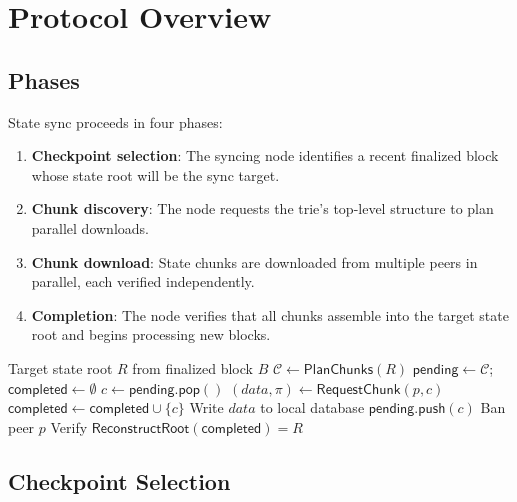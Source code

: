 \section{Protocol Overview}
\label{sec:overview}

\subsection{Phases}

State sync proceeds in four phases:

\begin{enumerate}
    \item \textbf{Checkpoint selection}: The syncing node identifies a recent finalized block whose state root will be the sync target.
    \item \textbf{Chunk discovery}: The node requests the trie's top-level structure to plan parallel downloads.
    \item \textbf{Chunk download}: State chunks are downloaded from multiple peers in parallel, each verified independently.
    \item \textbf{Completion}: The node verifies that all chunks assemble into the target state root and begins processing new blocks.
\end{enumerate}

\begin{algorithm}[H]
\caption{State Sync Main Loop}
\label{alg:main}
\begin{algorithmic}[1]
\Require Target state root $R$ from finalized block $B$
\State $\mathcal{C} \gets \mathsf{PlanChunks}(R)$ 
\State $\mathsf{pending} \gets \mathcal{C}$; $\mathsf{completed} \gets \emptyset$
        \State $c \gets \mathsf{pending}.\mathsf{pop}()$
        \State $(data, \pi) \gets \mathsf{RequestChunk}(p, c)$
            \State $\mathsf{completed} \gets \mathsf{completed} \cup \{c\}$
            \State Write $data$ to local database
        \Else
            \State $\mathsf{pending}.\mathsf{push}(c)$ 
            \State Ban peer $p$
        \EndIf
    \EndFor
\EndWhile
\State Verify $\mathsf{ReconstructRoot}(\mathsf{completed}) = R$
\end{algorithmic}
\end{algorithm}

\subsection{Checkpoint Selection}

